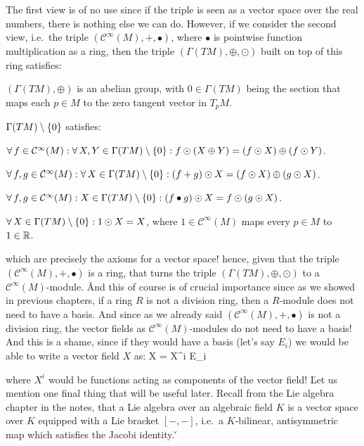 The first view is of no use since if the triple is seen as a vector space over the real numbers, there is nothing
else we can do. However, if we consider the second view, i.e.\ the triple $(\mathcal{C}^\infty(M),+,\bullet)$, where
$\bullet$ is pointwise function multiplication as a ring, then the triple $(\Gamma(TM),\oplus,\odot)$ built on top of
this ring satisfies:
\bit
\item $(\Gamma(TM),\oplus)$ is an abelian group, with $0\in \Gamma(TM)$ being the section that maps each $p\in M$
to the zero tangent vector in $T_p M$.
\item $\Gamma(TM)\setminus\{0\}$ satisfies:
\ben[label=\roman*)]
\item $\forall \, f \in \mathcal{C}^\infty(M) : \forall \, X,Y \in \Gamma(TM) \setminus\{0\}: f\odot(X\oplus Y)=(f\odot X)
\oplus (f\odot Y)$.
\item $\forall \, f,g \in \mathcal{C}^\infty(M) : \forall \, X \in \Gamma(TM)\setminus\{0\}: (f+g)\odot X= (f \odot X)
\oplus (g \odot X)$.
\item $\forall \, f,g \in \mathcal{C}^\infty(M) : X \in \Gamma(TM)\setminus\{0\} : (f\bullet g)\odot X= f \odot (g \odot X)$.
\item $\forall \, X \in \Gamma(TM) \setminus\{0\} : 1 \odot X = X$, where $1\in \mathcal{C}^\infty(M)$ maps every $p\in
M$ to $1\in \mathbb{R}$.
\een
\eit

which are precisely the axioms for a vector space! hence, given that the triple $(\mathcal{C}^\infty(M),+,\bullet)$ is
a ring, that turns the triple $(\Gamma(TM),\oplus,\odot)$ to a $\mathcal{C}^\infty(M)$-module. \v

And this of course is of crucial importance since as we showed in previous chapters, if a ring $R$ is not a division
ring, then a $R$-module does not need to have a basis. And since as we already said $(\mathcal{C}^\infty(M),+, \bullet)$
is not a division ring, the vector fields as $\mathcal{C}^\infty(M)$-modules do not need to have a basis! And this is a
shame, since if they would have a basis (let's say $E_i$) we would be able to write a vector field $X$ as:
\bse
X = X^i E_i
\ese

where $X^i$ would be functions acting as components of the vector field! \v

Let us mention one final thing that will be useful later. Recall from the Lie algebra chapter in the notes, that a
Lie algebra over an algebraic field $K$ is a vector space over $K$ equipped with a Lie bracket $[-,-]$, i.e.\ a
$K$-bilinear, antisymmetric map which satisfies the Jacobi identity. \v

